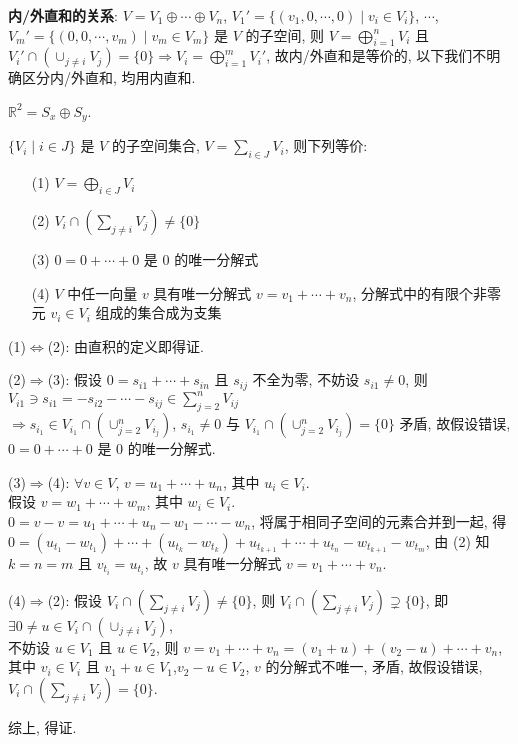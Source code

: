 \documentclass{note}
\begin{document}
\textbf{内/外直和的关系}:
$V=V_1\oplus\cdots\oplus V_n$, $V_1'=\{(v_1,0,\cdots,0)\mid v_i\in V_i\}$, $\cdots$, $V_m'=\{(0,0,\cdots,v_m)\mid v_m\in V_m\}$ 是 $V$ 的子空间, 则 $V=\bigoplus_{i=1}^nV_i$ 且 $V_i'\cap(\cup_{j\neq i}V_j)=\{0\}\Longrightarrow V_i=\bigoplus_{i=1}^mV_i'$, 故内/外直和是等价的, 以下我们不明确区分内/外直和, 均用内直和.

\begin{eg}
    $\mathbb{R}^2=S_x\oplus S_y$.
\end{eg}

\begin{thm}[(课本定理 1.5)]
    $\{V_i\mid i\in J\}$ 是 $V$ 的子空间集合, $V=\sum_{i\in J}V_i$, 则下列等价:
    \begin{itemize}
        \item[(1)] $V=\bigoplus_{i\in J}V_i$
        \item[(2)] $V_i\cap(\sum_{j\neq i}V_j)\neq\{0\}$
        \item[(3)] $0=0+\cdots+0$ 是 $0$ 的唯一分解式
        \item[(4)] $V$ 中任一向量 $v$ 具有唯一分解式 $v=v_1+\cdots+v_n$, 分解式中的有限个非零元 $v_i\in V_i$ 组成的集合成为支集
    \end{itemize}
\end{thm}
\begin{pf}
    (1)$\Longleftrightarrow$(2): 由直积的定义即得证.

    (2)$\Longrightarrow$(3): 假设 $0=s_{i1}+\cdots+s_{in}$ 且 $s_{ij}$ 不全为零, 不妨设 $s_{i1}\neq 0$, 则 $V_{i1}\ni s_{i1}=-s_{i2}-\cdots-s_{ij}\in\sum_{j=2}^nV_{ij}$\\
    $\Longrightarrow s_{i_1}\in V_{i_1}\cap(\cup_{j=2}^nV_{i_j})$, $s_{i_1}\neq 0$ 与 $V_{i_1}\cap(\cup_{j=2}^nV_{i_j})=\{0\}$ 矛盾, 故假设错误, $0=0+\cdots+0$ 是 $0$ 的唯一分解式.

    (3)$\Longrightarrow$(4): $\forall v\in V$, $v=u_1+\cdots+u_n$, 其中 $u_i\in V_i$.\\
    假设 $v=w_1+\cdots+w_m$, 其中 $w_i\in V_i$.\\
    $0=v-v=u_1+\cdots+u_n-w_1-\cdots-w_n$, 将属于相同子空间的元素合并到一起, 得 $0=(u_{t_1}-w_{t_1})+\cdots+(u_{t_k}-w_{t_k})+u_{t_{k+1}}+\cdots+u_{t_n}-w_{t_{k+1}}-w_{t_m}$, 由 (2) 知 $k=n=m$ 且 $v_{t_i}=u_{t_i}$, 故 $v$ 具有唯一分解式 $v=v_1+\cdots+v_n$.

    (4)$\Longrightarrow$(2): 假设 $V_i\cap(\sum_{j\neq i}V_j)\neq\{0\}$, 则 $V_i\cap(\sum_{j\neq i}V_j)\supsetneq\{0\}$, 即 $\exists 0\neq u\in V_i\cap(\cup_{j\neq i}V_j)$,\\
    不妨设 $u\in V_1$ 且 $u\in V_2$, 则 $v=v_1+\cdots+v_n=(v_1+u)+(v_2-u)+\cdots+v_n$, 其中 $v_i\in V_i$ 且 $v_1+u\in V_1$,$v_2-u\in V_2$, $v$ 的分解式不唯一, 矛盾, 故假设错误, $V_i\cap(\sum_{j\neq i}V_j)=\{0\}$.

    综上, 得证.
\end{pf}
\end{document}

